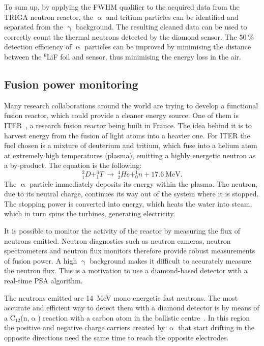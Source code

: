 To sum up, by applying the FWHM qualifier to the acquired data from the TRIGA neutron reactor, the $\upalpha$ and tritium particles can be identified and separated from the $\upgamma$ background. The resulting cleaned data can be used to correctly count the thermal neutrons detected by the diamond sensor. The $50~\%$ detection efficiency of $\upalpha$ particles can be improved by minimising the distance between the $^6$LiF foil and sensor, thus minimising the energy loss in the air.









\newpage\null\thispagestyle{empty}\newpage
\clearpage
\subsection{Fusion power monitoring}
\label{sec:fusion}
Many research collaborations around the world are trying to develop a functional fusion reactor, which could provide a cleaner energy source. One of them is ITER~\cite{ITER:00000}, a research fusion reactor being built in France. The idea behind it is to harvest energy from the fusion of light atoms into a heavier one. For ITER the fuel chosen is a mixture of deuterium and tritium, which fuse into a helium atom at extremely high temperatures (plasma), emitting a highly energetic neutron as a by-product. The equation is the following:
\begin{equation}
^2_1D+^3_1T ~\rightarrow~ ^4_2He+^1_0n+17.6~\textrm{MeV}.
\end{equation}
The $\upalpha$ particle immediately deposits its energy within the plasma. The neutron, due to its neutral charge, continues its way out of the system where it is stopped. The stopping power is converted into energy, which heats the water into steam, which in turn spins the turbines, generating electricity.

It is possible to monitor the activity of the reactor by measuring the flux of neutrons emitted. Neutron diagnostics such as neutron cameras, neutron spectrometers and neutron flux monitors therefore provide robust measurements of fusion power. A high $\upgamma$ background makes it difficult to accurately measure the neutron flux. This is a motivation to use a diamond-based detector with a real-time PSA algorithm.

The neutrons emitted are 14~MeV mono-energetic fast neutrons. The most accurate and efficient way to detect them with a diamond detector is by means of a C$_\mathrm{12}$(n,$\upalpha$) reaction with a carbon atom in the ballistic centre~\cite{PAVEL:00001}. In this region the positive and negative charge carriers created by $\upalpha$ that start drifting in the opposite directions need the same time to reach the opposite electrodes.

